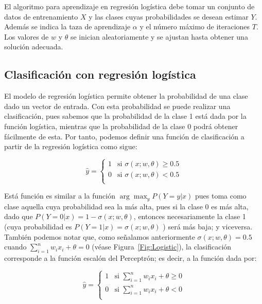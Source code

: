 El algoritmo para aprendizaje en regresión logística debe tomar un conjunto de datos de entrenamiento $X$ y las clases cuyas probabilidades se desean estimar $Y$. Además se indica la taza de aprendizaje $\alpha$ y el número máximo de iteraciones $T$. Los valores de $w$ y $\theta$ se inician aleatoriamente y se ajustan hasta obtener una solución adecuada.


\subsection{Clasificación con regresión logística}

El modelo de regresión logística permite obtener la probabilidad de una clase dado un vector de entrada. Con esta probabilidad se puede realizar una clasificación, pues sabemos que la probabilidad de la clase 1 está dada por la función logística, mientras que la probabilidad de la clase 0 podrá obtener fácilmente de esta. Por tanto, podemos definir una función de clasificación a partir de la regresión logística como sigue:

\begin{equation*}
    \hat{y} = \begin{cases} 1 & \text{si } \sigma(x; w, \theta) \geq 0.5 \\
        0 & \text{si } \sigma(x; w, \theta) < 0.5 \\
    \end{cases}
\end{equation*}

Está función es similar a la función $\arg\max_y P(Y=y|x)$ pues toma como clase aquella cuya probabilidad sea la más alta, pues si la clase 0 es más alta, dado que $P(Y=0|x) = 1-\sigma(x; w, \theta)$, entonces necesariamente la clase 1 (cuya probabilidad es $P(Y=1|x) = \sigma(x; w, \theta)$ ) será más baja; y viceversa. También podemos notar que, como señalamos anteriormente $\sigma(x; w, \theta) = 0.5$ cuando $\sum_{i=1}^n w_i x_i + \theta = 0$ (véase Figura~\ref{Fig:Logistic}), la clasificación corresponde a la función escalón del Perceptrón; es decir, a la función dada por:

\begin{equation*}
    \hat{y} = \begin{cases} 1 & \text{si } \sum_{i=1}^n w_i x_i + \theta \geq 0 \\
        0 & \text{si } \sum_{i=1}^n w_i x_i + \theta < 0 \\
    \end{cases}
\end{equation*}

